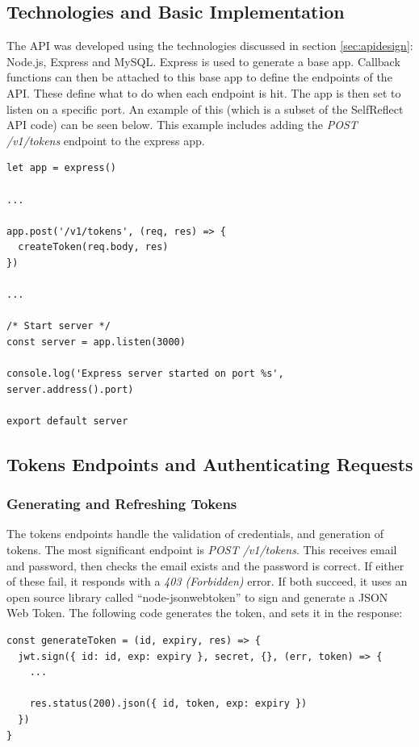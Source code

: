 \documentclass[11pt,openright,a4paper]{report}
\begin{document}
\subsection{Technologies and Basic Implementation}
The API was developed using the technologies discussed in section \ref{sec:apidesign}: Node.js, Express and MySQL. Express is used to generate a base app. Callback functions can then be attached to this base app to define the endpoints of the API. These define what to do when each endpoint is hit. The app is then set to listen on a specific port. An example of this (which is a subset of the SelfReflect API code) can be seen below. This example includes adding the \emph{POST /v1/tokens} endpoint to the express app.
\begin{lstlisting}
let app = express()

...

app.post('/v1/tokens', (req, res) => {
  createToken(req.body, res)
})

...

/* Start server */
const server = app.listen(3000)

console.log('Express server started on port %s', server.address().port)

export default server
\end{lstlisting}

\subsection{Tokens Endpoints and Authenticating Requests}
\subsubsection{Generating and Refreshing Tokens}
The tokens endpoints handle the validation of credentials, and generation of tokens. The most significant endpoint is \emph{POST /v1/tokens}. This receives email and password, then checks the email exists and the password is correct. If either of these fail, it responds with a \emph{403 (Forbidden)} error. If both succeed, it uses an open source library called \enquote{node-jsonwebtoken} \parencite{nodejwt} to sign and generate a JSON Web Token. The following code generates the token, and sets it in the response:
\begin{lstlisting}
const generateToken = (id, expiry, res) => {
  jwt.sign({ id: id, exp: expiry }, secret, {}, (err, token) => {
    ...

    res.status(200).json({ id, token, exp: expiry })
  })
}
\end{lstlisting}
\end{document}
